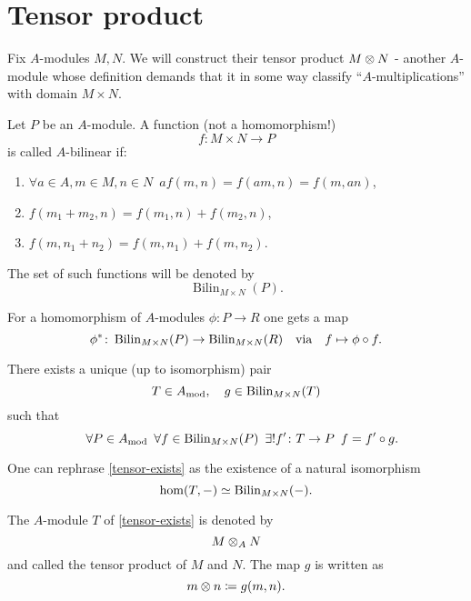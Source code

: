 \section{Tensor product}
Fix $A$-modules $M, N$. We will construct their tensor product $M \otimes N$ - another $A$-module whose definition demands that it in some way classify ``$A$-multiplications'' with domain $M \times N$.

\begin{df}
  \label{def-bilinear}
  Let $P$ be an $A$-module. A function (not a homomorphism!)
  \[ f \colon M \times N \to P\]
  is called $A$-bilinear if:
  \begin{enumerate}
  \item $\forall a \in A, m \in M, n \in N \enspace a f(m, n) = f(am, n) = f(m, an)$,
  \item $f(m_1 + m_2, n) = f(m_1, n) + f(m_2, n)$,
  \item $f(m, n_1 + n_2) = f(m, n_1) + f(m, n_2)$.
  \end{enumerate}
  The set of such functions will be denoted by
  \[ \operatorname{Bilin}_{M \times N} (P).\]
\end{df}

\begin{prop}
  \label{tensor-pullback}
  For a homomorphism of $A$-modules $\phi \colon P \to R$ one gets a map
  \[ \phi^* \colon \operatorname{Bilin}_{M \times N}(P) \to \operatorname{Bilin}_{M \times N}(R) \quad \text{via} \quad f \mapsto \phi \circ f.\]
\end{prop}

\begin{theorem}
  \label{tensor-exists}
  There exists a unique (up to isomorphism) pair
  \[ T \in A_\text{mod}, \quad g \in \operatorname{Bilin}_{M \times N}(T)\]
  such that
  \[ \quad \forall P \in A_\text{mod} \enspace \forall f \in \operatorname{Bilin}_{M \times N}(P) \enspace \exists \text{!} f' \colon T \to P \enspace f = f' \circ g.\]
\end{theorem}

\begin{note}
  One can rephrase \cref{tensor-exists} as the existence of a natural isomorphism
  \[ \hom(T, -) \simeq \operatorname{Bilin}_{M \times N}(-).\]
\end{note}

\begin{df}
  The $A$-module $T$ of \cref{tensor-exists} is denoted by
  \[ M \otimes_A N \]
  and called the tensor product of $M$ and $N$.
  The map $g$ is written as
  \[ m \otimes n \coloneqq g(m, n).\]
\end{df}

